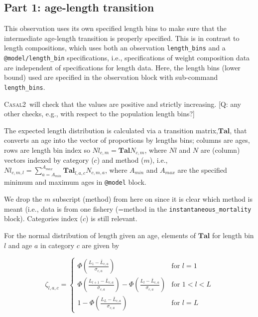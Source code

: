 \documentclass[a4paper,11pt,twoside,pdftex,draft]{article}
\newcommand{\CNAME}{\textsc{Casal2}}
\begin{document}
\subsection{Part 1: age-length transition}

This observation uses its own specified length bins to make sure that the intermediate age-length transition is properly specified. This is in contrast to length compositions, which uses both an observation \texttt{length\_bins} and a  \texttt{@model/length\_bin}  specifications, i.e., specifications of weight composition data are independent of specifications for length data. Here, the length bins (lower bound) used are specified in the observation block with sub-command \texttt{length\_bins}.

\CNAME~will check that the values are positive and strictly increasing. [Q: any other checks, e.g., with respect to the population length bins?]

The expected length distribution is calculated via 
a transition matrix,$\mathbf{Tal}$, that converts an age into the vector of proportions by lengths bins; columns are ages, rows are length bin index so $Nl_{c,m} = \mathbf{Tal} N_{c,m}$, where $Nl$ and $N$ are (column) vectors indexed by category ($c$) and method ($m$), i.e.,
$Nl_{c,m,l} = \sum_{a=A_{min}}^{A_{max}}  \mathbf{Tal}_{l,a,c} N_{c,m,a}$, where $A_{min}$ and $A_{max}$ are the specified minimum and maximum ages in \texttt{@model} block.

We drop the $m$ subscript (method) from here on since it is clear which method is meant (i.e., data is from one fishery (=method in the \texttt{instantaneous\_mortality} block). Categories index ($c$) is still relevant.

For the normal distribution of length given an age, 
elements of $\mathbf{Tal}$ for length bin $l$ and age $a$ in category $c$ are given by

\begin{equation}
\zeta_{l,a,c} =
\begin{cases}
\Phi\left( \frac{L_{1} - \bar L_{c,a}   }{\sigma_{c,a}} \right) & \text{for } l = 1 \\

\Phi\left( \frac{L_{l+1} - \bar L_{c,a}   }{\sigma_{c,a}} \right) - \Phi\left( \frac{L_{l} - \bar L_{c,a}   }{\sigma_{c,a}} \right) & \text{for } 1 < l < L \\

1 - \Phi\left( \frac{L_{L} - \bar L_{c,a}   }{\sigma_{c,a}} \right) & \text{for } l = L
\end{cases}
\end{equation}
\end{document}
